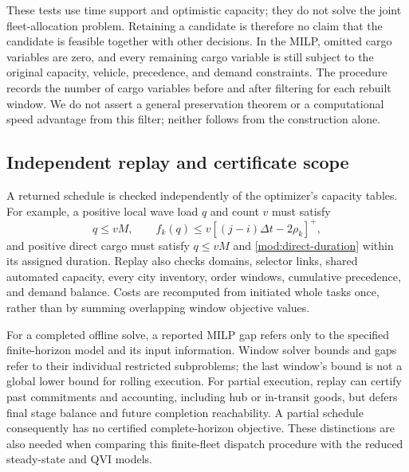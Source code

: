 These tests use time support and optimistic capacity; they do not solve
the joint fleet-allocation problem. Retaining a candidate is therefore no
claim that the candidate is feasible together with other decisions. In
the MILP, omitted cargo variables are zero, and every remaining cargo
variable is still subject to the original capacity, vehicle, precedence,
and demand constraints. The procedure records the number of cargo
variables before and after filtering for each rebuilt window. We do not
assert a general preservation theorem or a computational speed advantage
from this filter; neither follows from the construction alone.

\subsection{Independent replay and certificate scope}
\label{app:replay}

A returned schedule is checked independently of the optimizer's capacity
tables. For example, a positive local wave load $q$ and count $v$ must
satisfy
\begin{equation}
 q\leq vM,\qquad
 f_k(q)\leq v[(j-i)\Delta t-2\rho_k]^+,
 \label{alg:local-replay}
\end{equation}
and positive direct cargo must satisfy $q\leq vM$ and
\eqref{mod:direct-duration} within its assigned duration. Replay also
checks domains, selector links, shared automated capacity, every city
inventory, order windows, cumulative precedence, and demand balance.
Costs are recomputed from initiated whole tasks once, rather than by
summing overlapping window objective values.

For a completed offline solve, a reported MILP gap refers only to the
specified finite-horizon model and its input information. Window solver
bounds and gaps refer to their individual restricted subproblems; the
last window's bound is not a global lower bound for rolling execution.
For partial execution, replay can certify past commitments and accounting,
including hub or in-transit goods, but defers final stage balance and future
completion reachability. A partial schedule consequently has no certified
complete-horizon objective. These distinctions are also needed when
comparing this finite-fleet dispatch procedure with the reduced
steady-state and QVI models.

